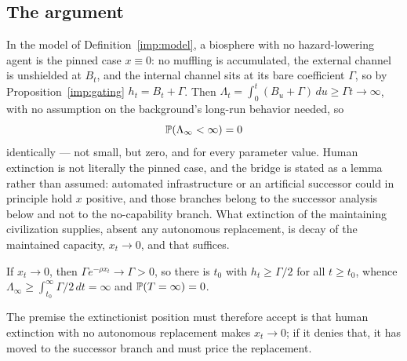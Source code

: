 \subsection{The argument}\label{hr:subsub:extinctionargument}

\begin{proposition}\label{hr:prop:extinction}
In the model of Definition~\ref{imp:model}, a biosphere with no hazard-lowering
agent is the pinned case $x\equiv0$: no muffling is accumulated, the
external channel is unshielded at $B_t$, and the internal channel sits
at its bare coefficient $\Gamma$, so by Proposition~\ref{imp:gating}
$h_t=B_t+\Gamma$. Then $\Lambda_t=\int_0^t(B_u+\Gamma)\,du\ge\Gamma t\to\infty$,
with no assumption on the background's long-run behavior needed, so
\[
\mathbb{P}(\Lambda_\infty<\infty)=0
\]
identically --- not small, but zero, and for every parameter value.
Human extinction is not literally the pinned case, and the bridge is
stated as a lemma rather than assumed: automated infrastructure or an
artificial successor could in principle hold $x$ positive, and those
branches belong to the successor analysis below and not to the
no-capability branch. What extinction of the maintaining civilization
supplies, absent any autonomous replacement, is decay of the maintained
capacity, $x_t\to0$, and that suffices.

\begin{lemma}
\label{hr:lem:decay}
If $x_t\to0$, then $\Gamma e^{-\rho x_t}\to\Gamma>0$, so there is $t_0$
with $h_t\ge\Gamma/2$ for all $t\ge t_0$, whence
$\Lambda_\infty\ge\int_{t_0}^\infty\Gamma/2\,dt=\infty$ and $\mathbb{P}(T=\infty)=0$.
\end{lemma}

\noindent The premise the extinctionist position must therefore
accept is that human extinction with no autonomous replacement makes
$x_t\to0$; if it denies that, it has moved to the successor branch and
must price the replacement.


\end{proposition}
